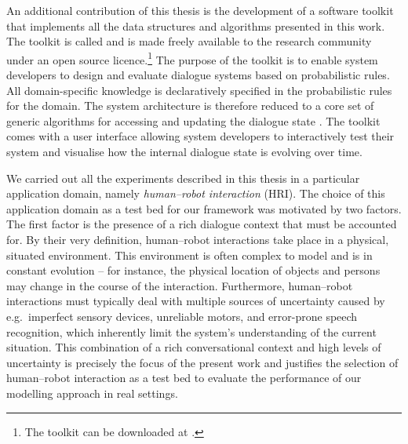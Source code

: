 An additional contribution of this thesis is the development of a software toolkit that implements all the data structures and algorithms presented in this work. The toolkit is called \opendial{}  and is made freely available to the research community under an open source licence.\footnote{The toolkit can be downloaded at .} The purpose of the toolkit is to enable system developers to design and evaluate dialogue systems based on probabilistic rules. All domain-specific knowledge is declaratively specified in the probabilistic rules for the domain. The system architecture is therefore reduced to a core set of generic algorithms for accessing and updating the dialogue state \citep{lison-semdial2012}. The \opendial{} toolkit comes with a user interface allowing system developers to interactively test their system and visualise how the internal dialogue state is evolving over time.  %

We carried out all the experiments described in this thesis in a particular application domain, namely \textit{human--robot interaction}  (HRI).  The choice of this application domain as a test bed for our framework was motivated by two factors.  The first factor is the presence of a rich dialogue context that must be accounted for. By their very definition,  human--robot interactions take place in a physical, situated environment.  This environment is often complex to model and is in constant evolution  -- for instance, the physical location of objects and persons may change in the course of the interaction. Furthermore, human--robot interactions must typically deal with  multiple sources of uncertainty caused by e.g.\ imperfect sensory devices, unreliable motors, and error-prone speech recognition, which inherently limit the system's understanding of the current situation.  This combination of a rich conversational context and high levels of uncertainty is precisely the focus of the present work and justifies the selection of  human--robot interaction as a test bed to evaluate the performance of our modelling approach in real settings.


